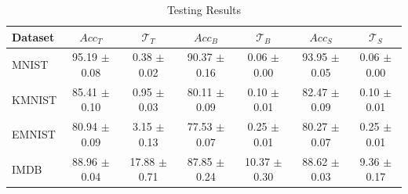 \begin{table}
\caption{Testing Results}
\label{tab:test-table-dkd}
\begin{tabular}{|l|c|c|c|c|c|c|}
\hline
Dataset & $Acc_T$ & $\mathcal{T}_T$ & $Acc_B$ & $\mathcal{T}_B$ & $Acc_S$ & $\mathcal{T}_S$ \\
\hline
MNIST & 95.19 \newline $\pm$ 0.08 & 0.38 \newline $\pm$ 0.02 & 90.37 \newline $\pm$ 0.16 & 0.06 \newline $\pm$ 0.00 & 93.95 \newline $\pm$ 0.05 & 0.06 \newline $\pm$ 0.00 \\\hline
KMNIST & 85.41 \newline $\pm$ 0.10 & 0.95 \newline $\pm$ 0.03 & 80.11 \newline $\pm$ 0.09 & 0.10 \newline $\pm$ 0.01 & 82.47 \newline $\pm$ 0.09 & 0.10 \newline $\pm$ 0.01 \\\hline
EMNIST & 80.94 \newline $\pm$ 0.09 & 3.15 \newline $\pm$ 0.13 & 77.53 \newline $\pm$ 0.07 & 0.25 \newline $\pm$ 0.01 & 80.27 \newline $\pm$ 0.07 & 0.25 \newline $\pm$ 0.01 \\\hline
IMDB & 88.96 \newline $\pm$ 0.04 & 17.88 \newline $\pm$ 0.71 & 87.85 \newline $\pm$ 0.24 & 10.37 \newline $\pm$ 0.30 & 88.62 \newline $\pm$ 0.03 & 9.36 \newline $\pm$ 0.17 \\\hline
\end{tabular}
\end{table}